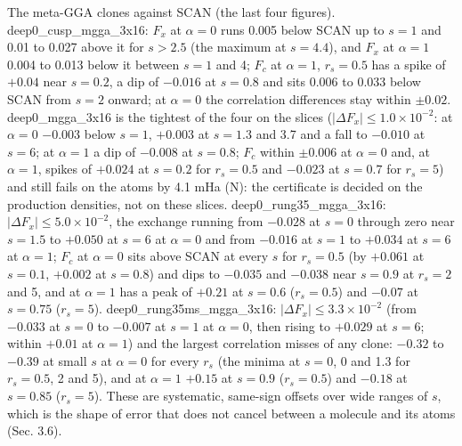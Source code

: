 \documentclass[10pt,a4paper]{article}
\begin{document}
The meta-GGA clones against SCAN (the last four figures). deep0\_cusp\_mgga\_3x16: $F_x$ at $\alpha = 0$ runs 0.005 below SCAN up to $s = 1$ and 0.01 to 0.027 above it for $s > 2.5$ (the maximum at $s = 4.4$), and $F_x$ at $\alpha = 1$ 0.004 to 0.013 below it between $s = 1$ and 4; $F_c$ at $\alpha = 1$, $r_s = 0.5$ has a spike of $+0.04$ near $s = 0.2$, a dip of $-0.016$ at $s = 0.8$ and sits 0.006 to 0.033 below SCAN from $s = 2$ onward; at $\alpha = 0$ the correlation differences stay within $\pm 0.02$. deep0\_mgga\_3x16 is the tightest of the four on the slices ($|\Delta F_x| \le 1.0 \times 10^{-2}$: at $\alpha = 0$ $-0.003$ below $s = 1$, $+0.003$ at $s = 1.3$ and 3.7 and a fall to $-0.010$ at $s = 6$; at $\alpha = 1$ a dip of $-0.008$ at $s = 0.8$; $F_c$ within $\pm 0.006$ at $\alpha = 0$ and, at $\alpha = 1$, spikes of $+0.024$ at $s = 0.2$ for $r_s = 0.5$ and $-0.023$ at $s = 0.7$ for $r_s = 5$) and still fails on the atoms by 4.1 mHa (N): the certificate is decided on the production densities, not on these slices. deep0\_rung35\_mgga\_3x16: $|\Delta F_x| \le 5.0 \times 10^{-2}$, the exchange running from $-0.028$ at $s = 0$ through zero near $s = 1.5$ to $+0.050$ at $s = 6$ at $\alpha = 0$ and from $-0.016$ at $s = 1$ to $+0.034$ at $s = 6$ at $\alpha = 1$; $F_c$ at $\alpha = 0$ sits above SCAN at every $s$ for $r_s = 0.5$ (by $+0.061$ at $s = 0.1$, $+0.002$ at $s = 0.8$) and dips to $-0.035$ and $-0.038$ near $s = 0.9$ at $r_s = 2$ and 5, and at $\alpha = 1$ has a peak of $+0.21$ at $s = 0.6$ ($r_s = 0.5$) and $-0.07$ at $s = 0.75$ ($r_s = 5$). deep0\_rung35ms\_mgga\_3x16: $|\Delta F_x| \le 3.3 \times 10^{-2}$ (from $-0.033$ at $s = 0$ to $-0.007$ at $s = 1$ at $\alpha = 0$, then rising to $+0.029$ at $s = 6$; within $+0.01$ at $\alpha = 1$) and the largest correlation misses of any clone: $-0.32$ to $-0.39$ at small $s$ at $\alpha = 0$ for every $r_s$ (the minima at $s = 0$, 0 and 1.3 for $r_s = 0.5$, 2 and 5), and at $\alpha = 1$ $+0.15$ at $s = 0.9$ ($r_s = 0.5$) and $-0.18$ at $s = 0.85$ ($r_s = 5$). These are systematic, same-sign offsets over wide ranges of $s$, which is the shape of error that does not cancel between a molecule and its atoms (Sec. 3.6).
\end{document}

